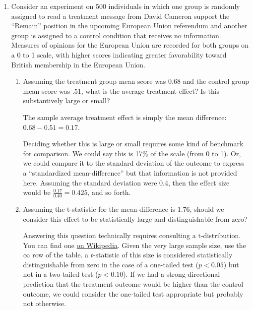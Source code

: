 \documentclass[a4paper]{exam}
\begin{document}
\begin{enumerate}
\begin{solution}
\end{solution}

\item Consider an experiment on 500 individuals in which one group is randomly assigned to read a treatment message from David Cameron support the ``Remain'' position in the upcoming European Union referendum and another group is assigned to a control condition that receives no information. Measures of opinions for the European Union are recorded for both groups on a 0 to 1 scale, with higher scores indicating greater favorability toward British membership in the European Union.

\begin{enumerate}
\item Assuming the treatment group mean score was 0.68 and the control group mean score was .51, what is the average treatment effect? Is this substantively large or small?

\begin{solution}

The sample average treatment effect is simply the mean difference: $0.68 - 0.51 = 0.17$.

Deciding whether this is large or small requires some kind of benchmark for comparison. We could say this is 17\% of the scale (from 0 to 1). Or, we could compare it to the standard deviation of the outcome to express a ``standardized mean-difference'' but that information is not provided here. Assuming the standard deviation were 0.4, then the effect size would be $\frac{0.17}{0.40} = 0.425$, and so forth.

\end{solution}

\item Assuming the t-statistic for the mean-difference is 1.76, should we consider this effect to be statistically large and distinguishable from zero?

\begin{solution}

Answering this question technically requires consulting a t-distribution. You can find one \href{https://en.wikipedia.org/wiki/Student\%27s_t-distribution#Table_of_selected_values}{on Wikipedia}. Given the very large sample size, use the $\infty$ row of the table. a $t$-statistic of this size is considered statistically distinguishable from zero in the case of a one-tailed test ($p<0.05$) but not in a two-tailed test ($p<0.10$). If we had a strong directional prediction that the treatment outcome would be higher than the control outcome, we could consider the one-tailed test appropriate but probably not otherwise.


\end{solution}
\end{enumerate}
\end{enumerate}
\end{document}
